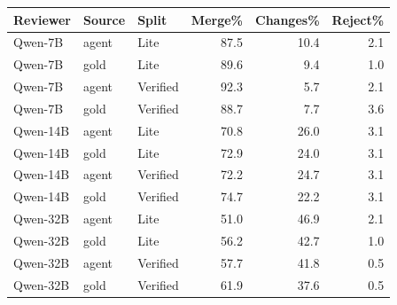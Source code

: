 \begin{tabular}{lllrrr}
\toprule
Reviewer & Source & Split & Merge\% & Changes\% & Reject\% \\
\midrule
Qwen-7B & agent & Lite & 87.5 & 10.4 & 2.1 \\
Qwen-7B & gold & Lite & 89.6 & 9.4 & 1.0 \\
Qwen-7B & agent & Verified & 92.3 & 5.7 & 2.1 \\
Qwen-7B & gold & Verified & 88.7 & 7.7 & 3.6 \\
Qwen-14B & agent & Lite & 70.8 & 26.0 & 3.1 \\
Qwen-14B & gold & Lite & 72.9 & 24.0 & 3.1 \\
Qwen-14B & agent & Verified & 72.2 & 24.7 & 3.1 \\
Qwen-14B & gold & Verified & 74.7 & 22.2 & 3.1 \\
Qwen-32B & agent & Lite & 51.0 & 46.9 & 2.1 \\
Qwen-32B & gold & Lite & 56.2 & 42.7 & 1.0 \\
Qwen-32B & agent & Verified & 57.7 & 41.8 & 0.5 \\
Qwen-32B & gold & Verified & 61.9 & 37.6 & 0.5 \\
\bottomrule
\end{tabular}
